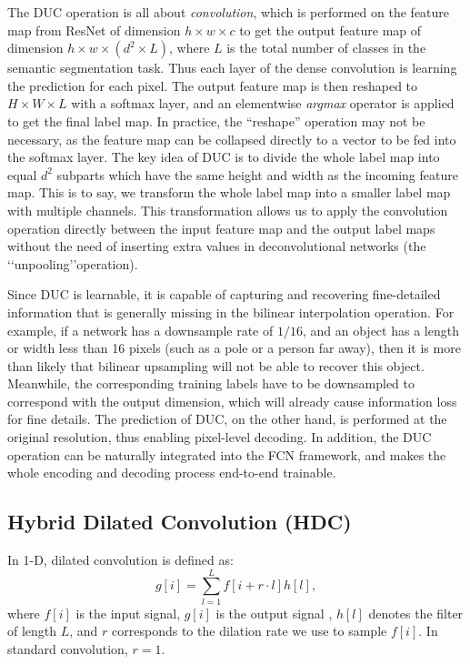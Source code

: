 \documentclass[10pt,twocolumn,letterpaper]{article}
\begin{document}
The DUC operation is all about \textit{convolution}, which is performed on the feature map from ResNet of dimension $h\times{w}\times{c}$ to get the output feature map of dimension $h\times{w}\times{(d^2\times{L})}$, where $L$ is the total number of classes in the semantic segmentation task. Thus each layer of the dense convolution is learning the prediction for each pixel. The output feature map is then reshaped to $H\times{W}\times{L}$ with a softmax layer, and an elementwise \textit{argmax} operator is applied to get the final label map. In practice, the ``reshape'' operation may not be necessary, as the feature map can be collapsed directly to a vector to be fed into the softmax layer. The key idea of DUC is to divide the whole label map into equal $d^2$ subparts which have the same height and width as the incoming feature map. This is to say, we transform the whole label map into a smaller label map with multiple channels. This transformation allows us to apply the convolution operation directly between the input feature map and the output label maps without the need of inserting extra values in deconvolutional networks (the \lq\lq unpooling\rq\rq operation).

Since DUC is learnable, it is capable of capturing and recovering fine-detailed information that is generally missing in the bilinear interpolation operation. For example, if a network has a downsample rate of $1/16$, and an object has a length or width less than 16 pixels (such as a pole or a person far away), then it is more than likely that bilinear upsampling will not be able to recover this object. Meanwhile, the corresponding training labels have to be downsampled to correspond with the output dimension, which will already cause information loss for fine details. The prediction of DUC, on the other hand, is performed at the original resolution, thus enabling pixel-level decoding. In addition, the DUC operation can be naturally integrated into the FCN framework, and makes the whole encoding and decoding process end-to-end trainable.

\subsection{Hybrid Dilated Convolution (HDC)}
In 1-D, dilated convolution is defined as:
\begin{equation}
g[i]=\sum_{l=1}^{L}f[i+r\cdot l]h[l],
\end{equation}
where $f[i]$ is the input signal, $g[i]$ is the output signal , $h[l]$ denotes the filter of length $L$, and $r$ corresponds to the dilation rate we use to sample $f[i]$. In standard convolution, $r=1$.
\end{document}

